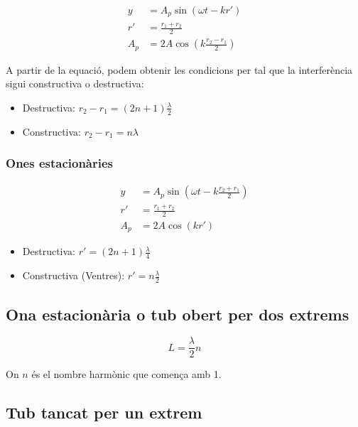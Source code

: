 \begin{align}
    y &= A_p\sin\left( \omega t -k r' \right) \\
    r' &= \frac{r_1+r_2}{2} \\
    A_p &= 2A\cos\left( k \frac{r_2-r_1}{2} \right)
\end{align}

A partir de la equació, podem obtenir les condicions per tal que la
interferència sigui constructiva o destructiva:

\begin{itemize}
    \item Destructiva: $r_2-r_1 = (2n+1)\frac{\lambda}{2}$
    \item Constructiva: $r_2 -r_1 = n\lambda$
\end{itemize}

\subsubsection{Ones estacionàries}
\label{ssub:ones_estacionaries}

\begin{align}
    y &= A_p\sin\left( \omega t -k \frac{r_2+r_1}{2} \right) \\
    r' &= \frac{r_1+r_2}{2} \\
    A_p &= 2A\cos\left( kr' \right)
\end{align}

\begin{itemize}
    \item Destructiva: $r' = (2n+1)\frac{\lambda}{4}$
    \item Constructiva (Ventres): $r' = n\frac{\lambda}{2}$
\end{itemize}

\subsection{Ona estacionària o tub obert per dos extrems}
\label{sub:ona_estacionaria_o_tub_obert_per_dos_extrems}

\begin{equation}
    L = \frac{\lambda}{2}n
\end{equation}

On $n$ és el nombre harmònic que comença amb 1.

\subsection{Tub tancat per un extrem}
\label{sub:tub_tancat_per_un_extrem}

